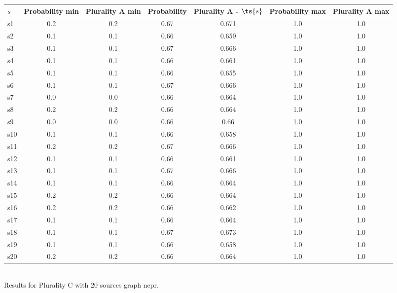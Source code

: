 \documentclass{article}
\begin{document}
\noindent\begin{tabular}{|l|c|c|c|c|c|c|}
\hline
$s$& Probability min & Plurality A min & Probability & Plurality A - $\ts{s}$ & Probability max & Plurality A max\\
\hline
s1 &0.2 & 0.2 & 0.67 & 0.671 & 1.0 & 1.0\\
\hline
s2 &0.1 & 0.1 & 0.66 & 0.659 & 1.0 & 1.0\\
\hline
s3 &0.1 & 0.1 & 0.67 & 0.666 & 1.0 & 1.0\\
\hline
s4 &0.1 & 0.1 & 0.66 & 0.661 & 1.0 & 1.0\\
\hline
s5 &0.1 & 0.1 & 0.66 & 0.655 & 1.0 & 1.0\\
\hline
s6 &0.1 & 0.1 & 0.67 & 0.666 & 1.0 & 1.0\\
\hline
s7 &0.0 & 0.0 & 0.66 & 0.664 & 1.0 & 1.0\\
\hline
s8 &0.2 & 0.2 & 0.66 & 0.664 & 1.0 & 1.0\\
\hline
s9 &0.0 & 0.0 & 0.66 & 0.66 & 1.0 & 1.0\\
\hline
s10 &0.1 & 0.1 & 0.66 & 0.658 & 1.0 & 1.0\\
\hline
s11 &0.2 & 0.2 & 0.67 & 0.666 & 1.0 & 1.0\\
\hline
s12 &0.1 & 0.1 & 0.66 & 0.661 & 1.0 & 1.0\\
\hline
s13 &0.1 & 0.1 & 0.67 & 0.666 & 1.0 & 1.0\\
\hline
s14 &0.1 & 0.1 & 0.66 & 0.664 & 1.0 & 1.0\\
\hline
s15 &0.2 & 0.2 & 0.66 & 0.664 & 1.0 & 1.0\\
\hline
s16 &0.2 & 0.2 & 0.66 & 0.662 & 1.0 & 1.0\\
\hline
s17 &0.1 & 0.1 & 0.66 & 0.664 & 1.0 & 1.0\\
\hline
s18 &0.1 & 0.1 & 0.67 & 0.673 & 1.0 & 1.0\\
\hline
s19 &0.1 & 0.1 & 0.66 & 0.658 & 1.0 & 1.0\\
\hline
s20 &0.2 & 0.2 & 0.66 & 0.664 & 1.0 & 1.0\\
\hline
\end{tabular}\\

\noindent Results for Plurality C with 20 sources graph ncpr.
\end{document}
